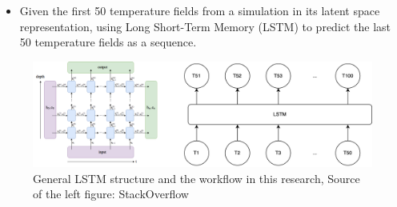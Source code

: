 {\begin{itemize}
    \item Given the first 50 temperature fields from a simulation in its latent space representation, using Long Short-Term Memory (LSTM) to predict the last 50 temperature fields as a sequence.

\end{itemize}

\begin{figure}[H]
    \centering
    \includegraphics[width=0.8\linewidth]{figures/LSTM_workflow.png}
    \caption{General LSTM structure and the workflow in this research, Source of the left figure: StackOverflow}
\end{figure}
}

